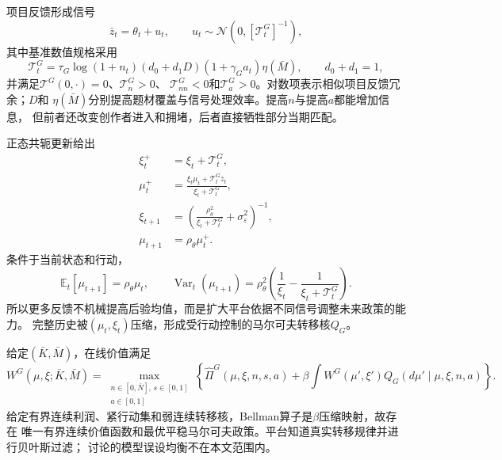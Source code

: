 \documentclass[UTF8, a4paper, 12pt, fontset=fandol]{ctexart}
\theoremstyle{definition}
\theoremstyle{remark}
\newcommand{\E}{\mathbb{E}}
\newcommand{\Var}{\operatorname{Var}}
\begin{document}
项目反馈形成信号
\begin{equation}
  \bar z_t=\theta_t+u_t,
  \qquad
  u_t\sim\mathcal N\!\left(0,[\mathcal T_t^G]^{-1}\right),
  \label{eq:项目反馈信号}
\end{equation}
其中基准数值规格采用
\begin{equation}
  \mathcal T_t^G
  =\tau_G\log(1+n_t)(d_0+d_1D)
  (1+\gamma_Ga_t)\eta(\bar M),
  \qquad d_0+d_1=1,
  \label{eq:反馈信号精度}
\end{equation}
并满足$\mathcal T^G(0,\cdot)=0$、$\mathcal T_n^G>0$、
$\mathcal T_{nn}^G<0$和$\mathcal T_a^G>0$。对数项表示相似项目反馈冗余；$D$和
$\eta(\bar M)$分别提高题材覆盖与信号处理效率。提高$n$与提高$a$都能增加信息，
但前者还改变创作者进入和拥堵，后者直接牺牲部分当期匹配。

正态共轭更新给出
\begin{align}
  \xi_t^+&=\xi_t+\mathcal T_t^G,\label{eq:本期过滤精度}\\
  \mu_t^+&=\frac{\xi_t\mu_t+\mathcal T_t^G\bar z_t}
  {\xi_t+\mathcal T_t^G},\label{eq:本期过滤均值}\\
  \xi_{t+1}
  &=\left(\frac{\rho_\theta^2}{\xi_t+\mathcal T_t^G}
  +\sigma_\varepsilon^2\right)^{-1},\label{eq:后验精度转移}\\
  \mu_{t+1}&=\rho_\theta\mu_t^+.
  \label{eq:后验均值转移}
\end{align}
条件于当前状态和行动，
\begin{equation}
  \E_t[\mu_{t+1}]=\rho_\theta\mu_t,
  \qquad
  \Var_t(\mu_{t+1})
  =\rho_\theta^2\left(\frac{1}{\xi_t}
  -\frac{1}{\xi_t+\mathcal T_t^G}\right).
  \label{eq:后验均值分布}
\end{equation}
所以更多反馈不机械提高后验均值，而是扩大平台依据不同信号调整未来政策的能力。
完整历史被$(\mu_t,\xi_t)$压缩，形成受行动控制的马尔可夫转移核$Q_G$。

给定$(\bar K,\bar M)$，在线价值满足
\begin{equation}
  W^G(\mu,\xi;\bar K,\bar M)
  =\max_{\substack{n\in[0,\bar N],\,s\in[0,1]\\a\in[0,1]}}
  \left\{
    \widehat\Pi^G(\mu,\xi,n,s,a)
    +\beta\int W^G(\mu',\xi')Q_G(d\mu'\mid\mu,\xi,n,a)
  \right\}.
  \label{eq:贝叶斯Bellman}
\end{equation}
给定有界连续利润、紧行动集和弱连续转移核，Bellman算子是$\beta$压缩映射，故存在
唯一有界连续价值函数和最优平稳马尔可夫政策。平台知道真实转移规律并进行贝叶斯过滤；
\citet{esponda2021misspecified}讨论的模型误设均衡不在本文范围内。
\end{document}
